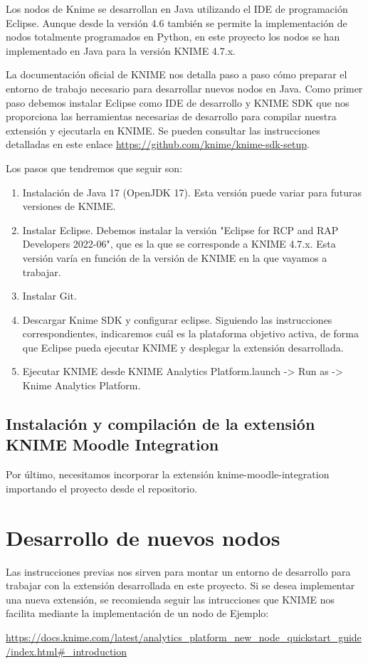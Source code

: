 Los nodos de Knime se desarrollan en Java utilizando el IDE de programación Eclipse. Aunque desde la versión 4.6 también se permite
 la implementación de nodos totalmente programados en Python, en este proyecto los nodos se han implementado en Java para la versión KNIME 4.7.x. 
\

La documentación oficial de KNIME nos detalla paso a paso cómo preparar el entorno de trabajo necesario para desarrollar
 nuevos nodos en Java. Como primer paso debemos instalar Eclipse como IDE de desarrollo y KNIME SDK que nos proporciona las herramientas 
 necesarias de desarrollo para compilar nuestra extensión y ejecutarla en KNIME. Se pueden consultar las instrucciones detalladas en este enlace \url{https://github.com/knime/knime-sdk-setup}. 
\

Los pasos que tendremos que seguir son:

\begin{enumerate}
	\item Instalación de Java 17 (OpenJDK 17). Esta versión puede variar para futuras versiones de KNIME. 
	\item Instalar Eclipse. Debemos instalar la versión "Eclipse for RCP and RAP Developers 2022-06", que es la que se corresponde a KNIME 4.7.x. 
  Esta versión varía en función de la versión de KNIME en la que vayamos a trabajar. 
	\item Instalar Git. 
	\item Descargar Knime SDK y configurar eclipse. Siguiendo las instrucciones correspondientes, indicaremos cuál es la plataforma objetivo activa, de forma 
  que Eclipse pueda ejecutar KNIME y desplegar la extensión desarrollada. 
  \item Ejecutar KNIME desde KNIME Analytics Platform.launch -> Run as -> Knime Analytics Platform. 
\end{enumerate}  


\subsection{Instalación y compilación de la extensión KNIME Moodle Integration}

Por último, necesitamos incorporar la extensión knime-moodle-integration importando el proyecto desde el repositorio. 
\



\section{Desarrollo de nuevos nodos}

Las instrucciones previas nos sirven para montar un entorno de desarrollo para trabajar con la extensión desarrollada en este proyecto. Si se desea implementar una nueva extensión, 
se recomienda seguir las intrucciones que KNIME nos facilita mediante la implementación de un nodo de Ejemplo: 

\url{https://docs.knime.com/latest/analytics_platform_new_node_quickstart_guide/index.html#_introduction}


